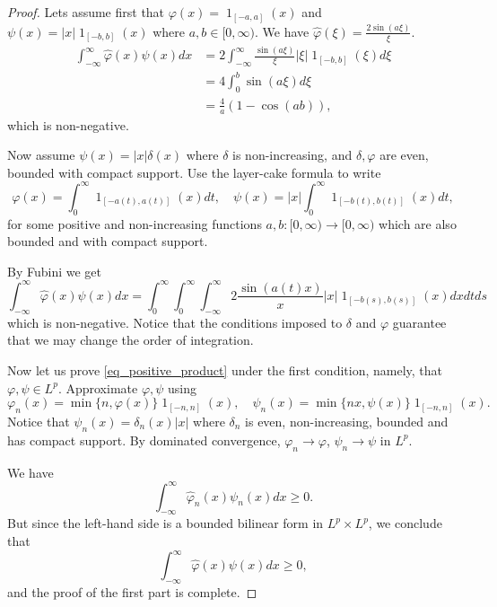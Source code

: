 \documentclass{amsart}
\renewcommand {\chi}{\operatorname{1}}
\begin{document}
\begin{proof}
	Lets assume first that $\varphi(x) = \chi_{[-a,a]}(x)$ and $\psi(x) = |x| \chi_{[-b,b]}(x)$
	where $a, b \in [0,\infty)$.
	We have $\hat \varphi(\xi) = \frac {2 \sin(a \xi)}\xi$.
	\begin{align}
		\int_{-\infty}^{\infty} \hat \varphi(x) \psi(x) d x 
		&= 2 \int_{-\infty}^{\infty} \frac {\sin(a \xi)}\xi |\xi| \chi_{[-b,b]}(\xi) d\xi \\
		&= 4 \int_0^b \sin(a \xi) d\xi \\
		&= \frac 4a (1- \cos(a b)),
	\end{align}
	which is non-negative.

	Now assume $\psi(x) = |x| \delta(x)$ where $\delta$ is non-increasing, and $\delta, \varphi$ are even, bounded with compact support.
	Use the layer-cake formula to write
	\[\varphi(x) = \int_0^\infty \chi_{[-a(t),a(t)]}(x) dt,\quad \psi(x) = |x| \int_0^\infty \chi_{[-b(t), b(t)]}(x) dt,\]
	for some positive and non-increasing functions $a,b:[0,\infty) \to [0,\infty)$ which are also bounded and with compact support.

	By Fubini we get
	\[\int_{-\infty}^{\infty} \hat \varphi(x) \psi(x) dx = \int_0^\infty \int_0^\infty \int_{-\infty}^{\infty} 2 \frac{\sin(a(t)x)}{x} |x| \chi_{[-b(s), b(s)]}(x) dx dt ds\]
	which is non-negative.
	Notice that the conditions imposed to $\delta$ and $\varphi$ guarantee that we may change the order of integration.

	Now let us prove \eqref{eq_positive_product} under the first condition, namely, that $\varphi, \psi \in L^p$. Approximate $\varphi,\psi$ using
	\[\varphi_n(x) = \min\{n, \varphi(x)\} \chi_{[-n,n]}(x), \quad \psi_n(x) = \min\{n x, \psi(x)\} \chi_{[-n,n]}(x).\]
	Notice that $\psi_n(x) = \delta_n(x) |x|$ where $\delta_n$ is even, non-increasing, bounded and has compact support.
	By dominated convergence, $\varphi_n \to \varphi$, $\psi_n \to \psi$ in $L^p$.

	We have 
	\[\int_{-\infty}^\infty \hat \varphi_n(x) \psi_n(x) dx \geq 0.\]
	But since the left-hand side is a bounded bilinear form in $L^p \times L^p$, we conclude that
	\[\int_{-\infty}^\infty \hat \varphi(x) \psi(x) dx \geq 0,\]
	and the proof of the first part is complete.


\end{proof}
\end{document}
